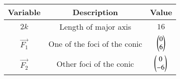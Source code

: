 \begin{tabular}[12pt]{ |c| c| c|}
    \hline
    \textbf{Variable} & \textbf{Description} & \textbf{Value}\\ 
    \hline
    $2k$ & Length of major axis & $16$ \\
    \hline 
    $\vec{F_1}$ & One of the foci of the conic & $\begin{pmatrix}0\\6\end{pmatrix}$\\
    \hline
    $\vec{F_2}$ & Other foci of the conic & $\begin{pmatrix}0\\-6\end{pmatrix}$\\
    \hline
\end{tabular}
